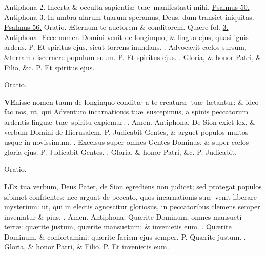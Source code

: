 \documentclass[letter,11pt]{book}
\makeatletter
\DeclareRobustCommand{\Vbar}{\vers@resp{-0.1em}{V}}
\DeclareRobustCommand{\Rbar}{\vers@resp{0pt}{R}}
\newcommand{\vers@resp@sym}{\raisebox{0.2ex}{\rotatebox[origin=c]{-20}{$\m@th\rceil$}}}
\newcommand{\vers@resp}[2]{%
  {\ooalign{\hidewidth\kern#1\vers@resp@sym\hidewidth\cr#2\cr}}%
}%
\def\P{\color{Red} P. \color{black}}
\def\V{\color{Red} \Vbar . \color{black}}
\def\R{\color{Red} \Rbar . \color{black}}
\makeatother
\begin{document}
\begin{multicols}{2}
\newline \color{Red} Antiphona 2. \color{black} Incerta \& occulta sapienti\ae \ tu\ae \ manifestasti mihi. \color{Red} \hyperlink{ps50}{Psalmus 50.} \color{black}
\newline \color{Red} Antiphona 3. \color{black} In umbra alarum tuarum speramus, Deus, dum transiet iniquitas. \color{Red} \hyperlink{ps56}{Psalmus 56.} Oratio. \color{black} \AE ternum te auctorem \& conditorem. \color{Red} Qu\ae re fol. \color{black} \hyperlink{page.3}{3.}
\newline \color{Red} Antiphona. \color{black} Ecce nomen Domini venit de longinquo, \& lingua ejus, quasi ignis ardens. \P Et spiritus ejus, sicut torrens inundans. \V Advocavit c\oe los sursum, \&terram discernere populum suum. \P Et spiritus ejus. \V Gloria, \& honor Patri, \& Filio, \&c. \P Et spiritus ejus.
\vspace{-.5em} \begin{center} \color{Red} Oratio. \end{center} \vspace{-.5em}
\lettrine[lines=2]{\bfseries \color{Red} V}{}Enisse nomen tuum de longinquo condit\ae \ a te creatur\ae \ tu\ae \ l\ae tantur: \& ideo fac nos, ut, qui Adventum incarnationis tu\ae \ suscepimus, a spinis peccatorum ardentis lingu\ae \ tu\ae \ spiritu expiemur. \R Amen.
\newline \color{Red} Antiphona. \color{black} De Sion exiet lex, \& verbum Domini de Hierusalem. \P Judicabit Gentes, \& arguet populos multos usque in novissimum. \V Excelsus super omnes Gentes Dominus, \& super c\oe los gloria ejus. \P Judicabit Gentes. \V Gloria, \& honor Patri, \&c. \P Judicabit.
\vspace{-.5em} \begin{center} \color{Red} Oratio. \end{center} \vspace{-.5em}
\lettrine[lines=2]{\bfseries \color{Red} L}{}Ex tua verbum, Deus Pater, de Sion egrediens non judicet; sed protegat populos sibimet confitentes: nec arguat de peccato, quos incarnationis su\ae \ venit liberare mysterium: ut, qui in electis agnoscitur gloriosus, in peccatoribus clemens semper inveniatur \& pius. \R Amen.
\newline \color{Red} Antiphona. \color{black} Qu\ae rite Dominum, omnes mansueti terr\ae : qu\ae rite justum, qu\ae rite mansuetum; \& invenietis eum. \V Qu\ae rite Dominum, \& confortamini: qu\ae rite faciem ejus semper. \P Qu\ae rite justum. \V Gloria, \& honor Patri, \& Filio. \P Et invenietis eum.

\end{multicols}
\end{document}
